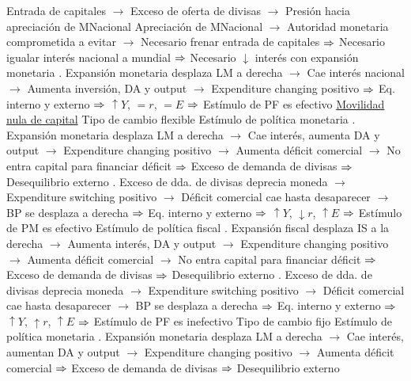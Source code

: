 \documentclass{nuevotema}
\begin{document}
\begin{esquemal}
				\4[] Entrada de capitales
				\4[] $\to$ Exceso de oferta de divisas
				\4[] $\to$ Presión hacia apreciación de MNacional
				\4[] Apreciación de MNacional
				\4[] $\to$ Autoridad monetaria comprometida a evitar
				\4[] $\to$ Necesario frenar entrada de capitales
				\4[] $\Rightarrow$ Necesario igualar interés nacional a mundial
				\4[] $\Rightarrow$ Necesario $\downarrow$ interés con expansión monetaria
				. Expansión monetaria desplaza LM a derecha
				\4[] $\to$ Cae interés nacional
				\4[] $\to$ Aumenta inversión, DA y output
				\4[] $\to$ Expenditure changing positivo
				\4[] $\Rightarrow$ Eq. interno y externo
				\4[] $\Rightarrow$ $\uparrow Y$, $= r$, $=E$
				\4[] $\Rightarrow$ Estímulo de PF es efectivo
				\4[] 
			\3 \underline{Movilidad nula de capital}
			\3[] Tipo de cambio flexible
				\4 Estímulo de política monetaria
				. Expansión monetaria desplaza LM a derecha
				\4[] $\to$ Cae interés, aumenta DA y output
				\4[] $\to$ Expenditure changing positivo
				\4[] $\to$ Aumenta déficit comercial
				\4[] $\to$ No entra capital para financiar déficit
				\4[] $\Rightarrow$ Exceso de demanda de divisas
				\4[] $\Rightarrow$ Desequilibrio externo
				. Exceso de dda. de divisas deprecia moneda
				\4[] $\to$ Expenditure switching positivo
				\4[] $\to$ Déficit comercial cae hasta desaparecer
				\4[] $\to$ BP se desplaza a derecha
				\4[] $\Rightarrow$ Eq. interno y externo
				\4[] $\Rightarrow$ $\uparrow Y$, $\downarrow r$, $\uparrow E$
				\4[] $\Rightarrow$ Estímulo de PM es efectivo
				\4[] 
				\4 Estímulo de política fiscal
				. Expansión fiscal desplaza IS a la derecha
				\4[] $\to$ Aumenta interés, DA y output
				\4[] $\to$ Expenditure changing positivo
				\4[] $\to$ Aumenta déficit comercial
				\4[] $\to$ No entra capital para financiar déficit
				\4[] $\Rightarrow$ Exceso de demanda de divisas
				\4[] $\Rightarrow$ Desequilibrio externo
				. Exceso de dda. de divisas deprecia moneda
				\4[] $\to$ Expenditure switching positivo
				\4[] $\to$ Déficit comercial cae hasta desaparecer
				\4[] $\to$ BP se desplaza a derecha
				\4[] $\Rightarrow$ Eq. interno y externo
				\4[] $\Rightarrow$ $\uparrow Y$, $\uparrow r$, $\uparrow E$
				\4[] $\Rightarrow$ Estímulo de PF es inefectivo
				\4[] 
			\3 Tipo de cambio fijo
				\4 Estímulo de política monetaria
				. Expansión monetaria desplaza LM a derecha
				\4[] $\to$ Cae interés, aumentan DA y output
				\4[] $\to$ Expenditure changing positivo
				\4[] $\to$ Aumenta déficit comercial
				\4[] $\Rightarrow$ Exceso de demanda de divisas
				\4[] $\Rightarrow$ Desequilibrio externo

\end{esquemal}
\end{document}
